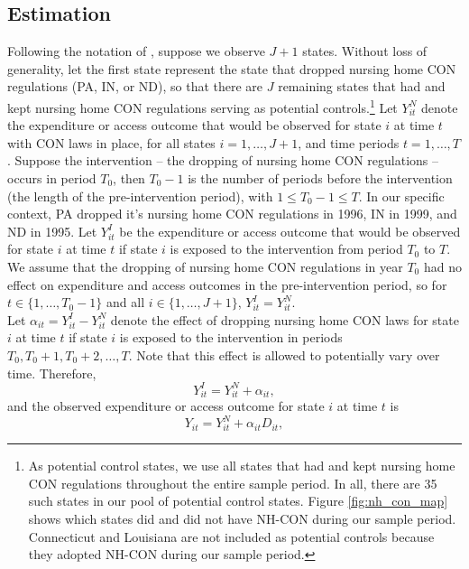 \documentclass[../Main.tex]{subfiles}
\begin{document}
\subsection{Estimation} \label{estimation}
Following the notation of \citet{abadie2010synthetic}, suppose we observe $J+1$ states. Without loss of generality, let the first state represent the state that dropped nursing home CON regulations (PA, IN, or ND), so that there are $J$ remaining states that had and kept nursing home CON regulations serving as potential controls.\footnote{As potential control states, we use all states that had and kept nursing home CON regulations throughout the entire sample period. In all, there are 35 such states in our pool of potential control states. Figure \ref{fig:nh_con_map} shows which states did and did not have NH-CON during our sample period. Connecticut and Louisiana are not included as potential controls because they adopted NH-CON during our sample period.} Let $Y_{it}^N$ denote the expenditure or access outcome that would be observed for state $i$ at time $t$ with CON laws in place, for all states $i=1,\dots,J+1$, and time periods $t=1,\dots,T$. Suppose the intervention -- the dropping of nursing home CON regulations -- occurs in period $T_0$, then $T_0-1$ is the number of periods before the intervention (the length of the pre-intervention period), with $1\leq T_0-1 \leq T$. In our specific context, PA dropped it's nursing home CON regulations in 1996, IN in 1999, and ND in 1995. Let $Y_{it}^I$ be the expenditure or access outcome that would be observed for state $i$ at time $t$ if state $i$ is exposed to the intervention from period $T_0$ to $T$. We assume that the dropping of nursing home CON regulations in year $T_0$ had no effect on expenditure and access outcomes in the pre-intervention period, so for $t\in \{1,\dots,T_0-1\}$ and all $i\in \{1,\dots,J+1\}$, $Y_{it}^I=Y_{it}^N$.\\
\indent Let $\alpha_{it}=Y_{it}^I-Y_{it}^N$ denote the effect of dropping nursing home CON laws for state $i$ at time $t$ if state $i$ is exposed to the intervention in periods $T_0, T_0+1, T_0+2,\dots, T$. Note that this effect is allowed to potentially vary over time. Therefore,
\begin{equation}
    Y_{it}^I=Y_{it}^N+\alpha_{it} ,
\end{equation}
and the observed expenditure or access outcome for state $i$ at time $t$ is 
\begin{equation}
    Y_{it}=Y_{it}^N+\alpha_{it}D_{it} ,
\end{equation}
\end{document}
